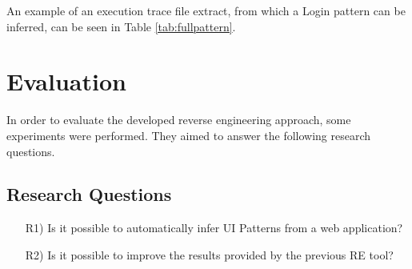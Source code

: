 \documentclass[10pt, conference, compsocconf]{IEEEtran}
\begin{document}
An example of an execution trace file extract, from which a Login pattern can be inferred, can be seen in Table \ref{tab:fullpattern}.

\begin{table}[!htb]
\caption{Execution trace example from which a Login pattern can be inferred.}
\label{tab:fullpattern}
\end{table}

\section{Evaluation}\label{sec:eval}

In order to evaluate the developed reverse engineering approach, some experiments were performed. They aimed to answer the following research questions.

\subsection{Research Questions}
\begin{itemize}
  \item[R1)] Is it possible to automatically infer UI Patterns from a web application?
  \item[R2)] Is it possible to improve the results provided by the previous RE tool?
\end{itemize}
\end{document}
